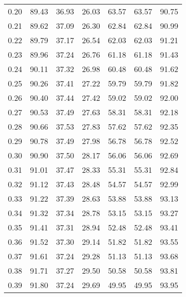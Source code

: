 \begin{tabular}{|c|c|c|c|c|c|c|}
      0.20 &     89.43 &     36.93 &      26.03 &   63.57 &      63.57 &         90.75 \\
      0.21 &     89.62 &     37.09 &      26.30 &   62.84 &      62.84 &         90.99 \\
      0.22 &     89.79 &     37.17 &      26.54 &   62.03 &      62.03 &         91.21 \\
      0.23 &     89.96 &     37.24 &      26.76 &   61.18 &      61.18 &         91.43 \\
      0.24 &     90.11 &     37.32 &      26.98 &   60.48 &      60.48 &         91.62 \\
      0.25 &     90.26 &     37.41 &      27.22 &   59.79 &      59.79 &         91.82 \\
      0.26 &     90.40 &     37.44 &      27.42 &   59.02 &      59.02 &         92.00 \\
      0.27 &     90.53 &     37.49 &      27.63 &   58.31 &      58.31 &         92.18 \\
      0.28 &     90.66 &     37.53 &      27.83 &   57.62 &      57.62 &         92.35 \\
      0.29 &     90.78 &     37.49 &      27.98 &   56.78 &      56.78 &         92.52 \\
      0.30 &     90.90 &     37.50 &      28.17 &   56.06 &      56.06 &         92.69 \\
      0.31 &     91.01 &     37.47 &      28.33 &   55.31 &      55.31 &         92.84 \\
      0.32 &     91.12 &     37.43 &      28.48 &   54.57 &      54.57 &         92.99 \\
      0.33 &     91.22 &     37.39 &      28.63 &   53.88 &      53.88 &         93.13 \\
      0.34 &     91.32 &     37.34 &      28.78 &   53.15 &      53.15 &         93.27 \\
      0.35 &     91.41 &     37.31 &      28.94 &   52.48 &      52.48 &         93.41 \\
      0.36 &     91.52 &     37.30 &      29.14 &   51.82 &      51.82 &         93.55 \\
      0.37 &     91.61 &     37.24 &      29.28 &   51.13 &      51.13 &         93.68 \\
      0.38 &     91.71 &     37.27 &      29.50 &   50.58 &      50.58 &         93.81 \\
      0.39 &     91.80 &     37.24 &      29.69 &   49.95 &      49.95 &         93.95 \\

\end{tabular}
